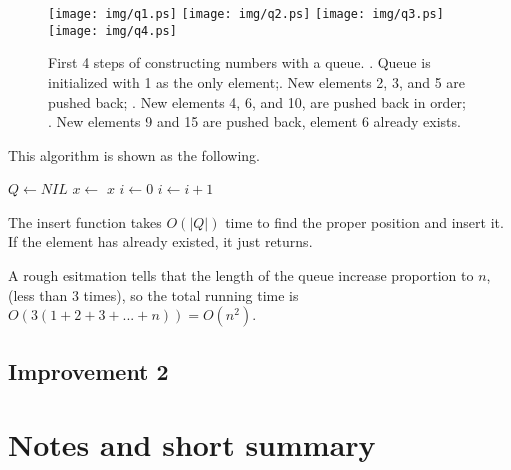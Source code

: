 \documentclass{article}
\begin{document}
\begin{figure}[htbp]
       \begin{center}
       	  \texttt{[image: img/q1.ps]}
       	  \texttt{[image: img/q2.ps]}
       	  \texttt{[image: img/q3.ps]}
       	  \texttt{[image: img/q4.ps]}
        \caption{First 4 steps of constructing numbers with a queue. . Queue is initialized with 1 as the only element;. New elements 2, 3, and 5 are pushed back; . New elements 4, 6, and 10, are pushed back in order; . New elements 9 and 15 are pushed back, element 6 already exists.} \label{fig:queues}
       \end{center}
\end{figure}

This algorithm is shown as the following.

\begin{algorithmic}[1]
  \State $Q \gets NIL$
  \State {}
    \State $x \gets$ 
    \State {}
    \State {}
    \State {}
  \EndWhile
  \State \Return $x$
\EndFunction
\Statex
{}
  \State $i \gets 0$
    \State $i \gets i + 1$
  \EndWhile
    \State \Return
  \EndIf
  \State {}
\EndFunction
\end{algorithmic}

The insert function takes $O(|Q|)$ time to find the proper position and insert
it. If the element has already existed, it just returns.

A rough esitmation tells that the length of the queue increase proportion to $n$,
(less than 3 times), so the total running time is $O(3(1+2+3+...+n)) = O(n^2)$. 

\subsection{Improvement 2}

\section{Notes and short summary}
\end{document}
